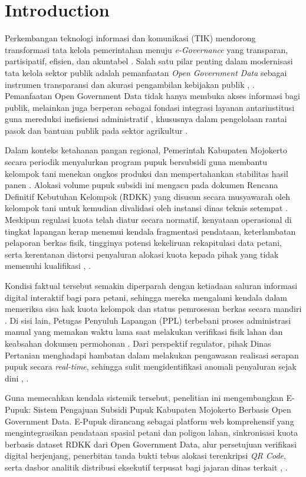 ﻿\documentclass[conference]{IEEEtran}
\begin{document}
\section{Introduction}  
Perkembangan teknologi informasi dan komunikasi (TIK) mendorong transformasi tata kelola pemerintahan menuju \textit{e-Governance} yang transparan, partisipatif, efisien, dan akuntabel \cite{b1}. Salah satu pilar penting dalam modernisasi tata kelola sektor publik adalah pemanfaatan \textit{Open Government Data} sebagai instrumen transparansi dan akurasi pengambilan kebijakan publik \cite{b2}, \cite{b3}. Pemanfaatan Open Government Data tidak hanya membuka akses informasi bagi publik, melainkan juga berperan sebagai fondasi integrasi layanan antarinstitusi guna mereduksi inefisiensi administratif \cite{b3}, khususnya dalam pengelolaan rantai pasok dan bantuan publik pada sektor agrikultur \cite{b6}.

Dalam konteks ketahanan pangan regional, Pemerintah Kabupaten Mojokerto secara periodik menyalurkan program pupuk bersubsidi guna membantu kelompok tani menekan ongkos produksi dan mempertahankan stabilitas hasil panen \cite{b5}. Alokasi volume pupuk subsidi ini mengacu pada dokumen Rencana Definitif Kebutuhan Kelompok (RDKK) yang disusun secara musyawarah oleh kelompok tani untuk kemudian divalidasi oleh instansi dinas teknis setempat \cite{b4}. Meskipun regulasi kuota telah diatur secara normatif, kenyataan operasional di tingkat lapangan kerap menemui kendala fragmentasi pendataan, keterlambatan pelaporan berkas fisik, tingginya potensi kekeliruan rekapitulasi data petani, serta kerentanan distorsi penyaluran alokasi kuota kepada pihak yang tidak memenuhi kualifikasi \cite{b5}, \cite{b7}.

Kondisi faktual tersebut semakin diperparah dengan ketiadaan saluran informasi digital interaktif bagi para petani, sehingga mereka mengalami kendala dalam memeriksa sisa hak kuota kelompok dan status pemrosesan berkas secara mandiri \cite{b7}. Di sisi lain, Petugas Penyuluh Lapangan (PPL) terbebani proses administrasi manual yang memakan waktu lama saat melakukan verifikasi fisik lahan dan keabsahan dokumen permohonan \cite{b6}. Dari perspektif regulator, pihak Dinas Pertanian menghadapi hambatan dalam melakukan pengawasan realisasi serapan pupuk secara \textit{real-time}, sehingga sulit mengidentifikasi anomali penyaluran sejak dini \cite{b3}, \cite{b5}.

Guna memecahkan kendala sistemik tersebut, penelitian ini mengembangkan E-Pupuk: Sistem Pengajuan Subsidi Pupuk Kabupaten Mojokerto Berbasis Open Government Data. E-Pupuk dirancang sebagai platform web komprehensif yang mengintegrasikan pendataan spasial petani dan poligon lahan, sinkronisasi kuota berbasis dataset RDKK dari Open Government Data, alur persetujuan verifikasi digital berjenjang, penerbitan tanda bukti tebus alokasi terenkripsi \textit{QR Code}, serta dasbor analitik distribusi eksekutif terpusat bagi jajaran dinas terkait \cite{b6}, \cite{b7}.
\end{document}
